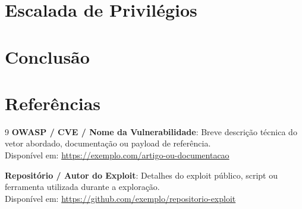 \documentclass[12pt]{article}
\begin{document}
\section{Escalada de Privilégios}


\section{Conclusão}

\section{Referências}

\begin{thebibliography}{9}
    \textbf{OWASP / CVE / Nome da Vulnerabilidade}: Breve descrição técnica do vetor abordado, documentação ou payload de referência. \\
    Disponível em: \url{https://exemplo.com/artigo-ou-documentacao}
    
    \textbf{Repositório / Autor do Exploit}: Detalhes do exploit público, script ou ferramenta utilizada durante a exploração. \\
    Disponível em: \url{https://github.com/exemplo/repositorio-exploit}

\end{thebibliography}
\end{document}
